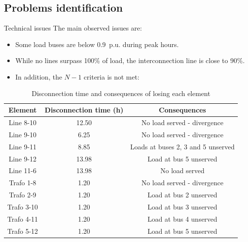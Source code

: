 \subsection{Problems identification}
\begin{frame}{Technical issues}
  The main observed issues are:

  \begin{itemize}
    \item Some load buses are below 0.9~p.u. during peak hours.
    \item While no lines surpass 100\% of load, the interconnection line is close to 90\%.
    \item In addition, the $N-1$ criteria is not met:
  \end{itemize}


\begin{table}[!htb]\centering\footnotesize
  \begin{tabular}[]{ccc}
    \hline 
    \textbf{Element} & \textbf{Disconnection time (h)} & \textbf{Consequences} \\
    \hline
    Line 8-10 & 12.50 & No load served - divergence \\
    Line 9-10 & 6.25 & No load served - divergence \\
    Line 9-11 & 8.85 & Loads at buses 2, 3 and 5 unserved \\
    Line 9-12 & 13.98 & Load at bus 5 unserved \\
    Line 11-6 & 13.98 & No load served \\
    Trafo 1-8 & 1.20 & No load served - divergence \\
    Trafo 2-9 & 1.20 & Load at bus 2 unserved \\
    Trafo 3-10 & 1.20 & Load at bus 3 unserved \\
    Trafo 4-11 & 1.20 & Load at bus 4 unserved \\
    Trafo 5-12 & 1.20 & Load at bus 5 unserved \\
    \hline
  \end{tabular}
  \caption{Disconnection time and consequences of losing each element}
  \label{tab:lt1}
\end{table}

\end{frame}






